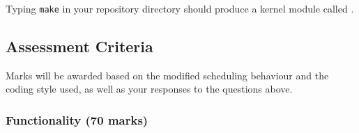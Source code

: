 \documentclass[12pt,a4paper]{article}
\begin{document}
Typing \texttt{make} in your  repository directory should produce a
kernel module called .







\clearpage
\subsection*{Assessment Criteria}

Marks will be awarded based on the modified scheduling behaviour and the coding
style used, as well as your responses to the questions above.

\subsubsection*{Functionality (70 marks)}
\end{document}
